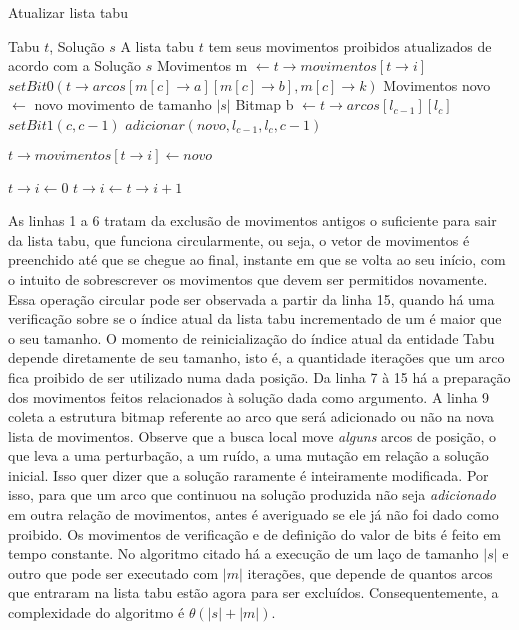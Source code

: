 	\begin{algorithm}[H]
    \caption{Atualizar lista tabu}
    \begin{algorithmic}[1]
    \REQUIRE Tabu $t$, Solução $s$
    \ENSURE A lista tabu $t$ tem seus movimentos proibidos atualizados de acordo com a Solução $s$
    \STATE Movimentos m  $\leftarrow t \rightarrow movimentos[t \rightarrow i]$
			\STATE $setBit0(t \rightarrow arcos [m[c] \rightarrow a][m[c] \rightarrow b], m[c] \rightarrow k)$
		\ENDFOR
    \ENDIF
    \STATE Movimentos novo $\leftarrow$ novo movimento de tamanho $|s|$
		\STATE Bitmap b $\leftarrow t \rightarrow arcos [l_{c-1}][l_c]$
			\STATE $setBit1(c, c-1)$
			\STATE $adicionar(novo, l_{c-1}, l_c, c-1)$
		\ENDIF
    \ENDFOR
    
    \STATE $t \rightarrow movimentos [t \rightarrow i] \leftarrow novo$
    
    	\STATE $t \rightarrow i \leftarrow 0$
    \ELSE
    	\STATE $t \rightarrow i \leftarrow t \rightarrow i + 1$    
    \ENDIF
    \end{algorithmic}
    \end{algorithm}
    
\par As linhas 1 a 6 tratam da exclusão de movimentos antigos o suficiente para sair da lista tabu, que funciona circularmente, ou seja, o vetor de movimentos é preenchido até que se chegue ao final, instante em que se volta ao seu início, com o intuito de sobrescrever os movimentos que devem ser permitidos novamente. Essa operação circular pode ser observada a partir da linha 15, quando há uma verificação sobre se o índice atual da lista tabu incrementado de um é maior que o seu tamanho. O momento de reinicialização do índice atual da entidade Tabu depende diretamente de seu tamanho, isto é, a quantidade iterações que um arco fica proibido de ser utilizado numa dada posição. Da linha 7 à 15 há a preparação dos movimentos feitos relacionados à solução dada como argumento. A linha 9 coleta a estrutura bitmap referente ao arco que será adicionado ou não na nova lista de movimentos. Observe que a busca local move \textit{alguns} arcos de posição, o que leva a uma perturbação, a um ruído, a uma mutação em relação a solução inicial. Isso quer dizer que a solução raramente é inteiramente modificada. Por isso, para que um arco que continuou na solução produzida não seja \textit{adicionado} em outra relação de movimentos, antes é averiguado se ele já não foi dado como proibido. Os movimentos de verificação e de definição do valor de bits é feito em tempo constante. No algoritmo citado há a execução de um laço de tamanho $|s|$ e outro que pode ser executado com $|m|$ iterações, que depende de quantos arcos que entraram na lista tabu estão agora para ser excluídos. Consequentemente, a complexidade do algoritmo é $\theta(|s| + |m|)$.

